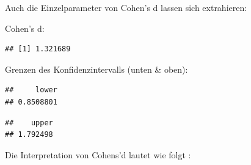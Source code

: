 \documentclass[
]{book}
\newenvironment{Shaded}{\begin{snugshade}}{\end{snugshade}}
\newcommand{\AttributeTok}[1]{\textcolor[rgb]{0.13,0.29,0.53}{#1}}
\newcommand{\DecValTok}[1]{\textcolor[rgb]{0.00,0.00,0.81}{#1}}
\newcommand{\FunctionTok}[1]{\textcolor[rgb]{0.13,0.29,0.53}{\textbf{#1}}}
\newcommand{\NormalTok}[1]{#1}
\newcommand{\SpecialCharTok}[1]{\textcolor[rgb]{0.81,0.36,0.00}{\textbf{#1}}}
\begin{document}
Auch die Einzelparameter von Cohen's d lassen sich extrahieren:

Cohen's d:

\begin{Shaded}
\end{Shaded}

\begin{verbatim}
## [1] 1.321689
\end{verbatim}

Grenzen des Konfidenzintervalls (unten \& oben):

\begin{Shaded}
\end{Shaded}

\begin{verbatim}
##     lower 
## 0.8508801
\end{verbatim}

\begin{Shaded}
\end{Shaded}

\begin{verbatim}
##    upper 
## 1.792498
\end{verbatim}

Die Interpretation von Cohens'd lautet wie folgt \citet{cohen1992quantitative}:
\end{document}
